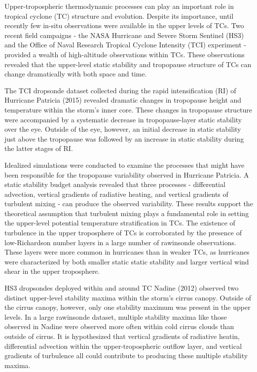  


\indent \indent Upper-tropospheric thermodynamic processes can play an important role in tropical cyclone (TC) structure and evolution.
Despite its importance, until recently few in-situ observations were available in the upper levels of TCs.
Two recent field campaigns - the NASA Hurricane and Severe Storm Sentinel (HS3) and the Office of Naval Research Tropical Cyclone Intensity (TCI) experiment - provided a wealth of high-altitude observations within TCs.
These observations revealed that the upper-level static stability and tropopause structure of TCs can change dramatically with both space and time.

The TCI dropsonde dataset collected during the rapid intensification (RI) of Hurricane Patricia (2015) revealed dramatic changes in tropopause height and temperature within the storm's inner core.
These changes in tropopause structure were accompanied by a systematic decrease in tropopause-layer static stability over the eye.
Outside of the eye, however, an initial decrease in static stability just above the tropopause was followed by an increase in static stability during the latter stages of RI.

Idealized simulations were conducted to examine the processes that might have been responsible for the tropopause variability observed in Hurricane Patricia.
A static stability budget analysis revealed that three processes - differential advection, vertical gradients of radiative heating, and vertical gradients of turbulent mixing - can produce the observed variability.
These results support the theoretical assumption that turbulent mixing plays a fundamental role in setting the upper-level potential temperature stratification in TCs.
The existence of turbulence in the upper troposphere of TCs is corroborated by the presence of low-Richardson number layers in a large number of rawinsonde observations.
These layers were more common in hurricanes than in weaker TCs, as hurricanes were characterized by both smaller static static stability and larger vertical wind shear in the upper troposphere.

HS3 dropsondes deployed within and around TC Nadine (2012) observed two distinct upper-level stability maxima within the storm's cirrus canopy.
Outside of the cirrus canopy, however, only one stability maximum was present in the upper levels.
In a large rawinsonde dataset, multiple stability maxima like those observed in Nadine were observed more often within cold cirrus clouds than outside of cirrus.
It is hypothesized that vertical gradients of radiative heatin, differential advection within the upper-tropospheric outflow layer, and vertical gradients of turbulence all could contribute to producing these multiple stability maxima.
